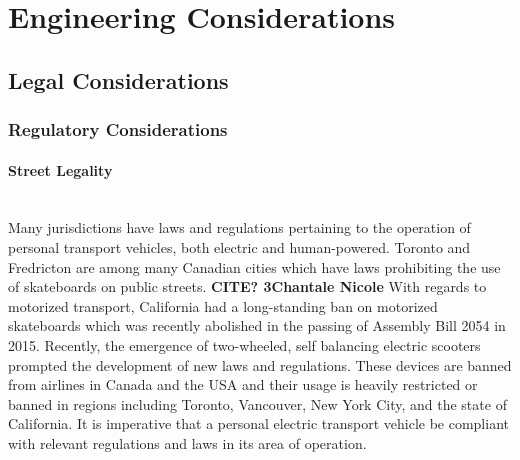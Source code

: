 \section{Engineering Considerations}
\subsection{Legal Considerations}

\subsubsection{Regulatory Considerations}

\paragraph{Street Legality}\mbox{}\\

Many jurisdictions have laws and regulations pertaining to the operation of personal transport vehicles, both electric and human-powered. 
Toronto and Fredricton are among many Canadian cities which have laws prohibiting the use of skateboards on public streets. \textbf{CITE? 3Chantale Nicole}
With regards to motorized transport, California had a long-standing ban on motorized skateboards which was recently abolished in the passing of Assembly Bill 2054 in 2015. \cite{OCLaws} \cite{WSJLaws}
Recently, the emergence of two-wheeled, self balancing electric scooters prompted the development of new laws and regulations. 
These devices are banned from airlines in Canada and the USA and their usage is heavily restricted or banned in regions including Toronto, Vancouver, New York City, and the state of California. \cite{leetboard}
It is imperative that a personal electric transport vehicle be compliant with relevant regulations and laws in its area of operation.


